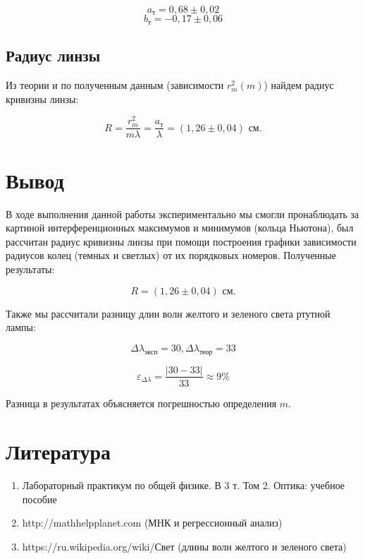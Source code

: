 \documentclass[a4paper, 12pt]{article}%
\begin{document}
\[ a_{\text{т}} = 0,68 \pm 0,02  \]
\[ b_{\text{т}} = -0,17 \pm 0,06 \]

\subsection{Радиус линзы}

Из теории и по полученным данным (зависимости $r_m^2 (m)$) найдем радиус кривизны линзы:

\[ R=\frac{r_{m}^{2}}{m \lambda} = \frac{a_{\text{т}}}{\lambda} = (1,26 \pm 0,04) \text{ см} .\]


\section{Вывод}

В ходе выполнения данной работы экспериментально мы смогли пронаблюдать за картиной интерференционных максимумов и минимумов (кольца Ньютона), был рассчитан радиус кривизны линзы при помощи построения графики зависимости радиусов колец (темных и светлых) от их порядковых номеров. Полученные результаты:

\[ R = (1,26 \pm 0,04) \text{ см} .\]

Также мы рассчитали разницу длин волн желтого и зеленого света ртутной лампы: 

\[ \Delta \lambda_{\text{эксп}} = 30, \Delta \lambda_{\text{теор}} = 33\]

\[ \varepsilon_{\Delta \lambda} = \frac{|30 - 33|}{33} \approx 9\% \]

Разница в результатах объясняется погрешностью определения $m$.

\section{Литература}

\begin{enumerate}

\item Лабораторный практикум по общей физике. В 3 т. Том 2. Оптика: учебное пособие

\item http://mathhelpplanet.com (МНК и регрессионный анализ)

\item https://ru.wikipedia.org/wiki/Свет (длины волн желтого и зеленого света)

\end{enumerate}	
\end{document}
